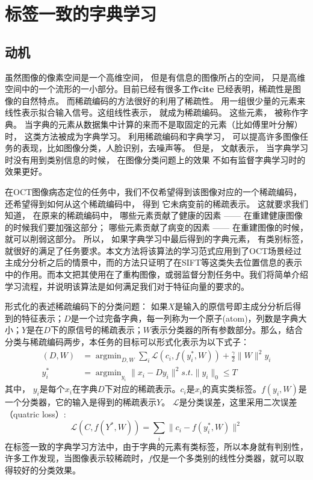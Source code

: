 \section{标签一致的字典学习}
\label{sec:lc-ksvd}
    \subsection{动机}
    虽然图像的像素空间是一个高维空间， 但是有信息的图像所占的空间， 只是高维空间中的一个流形的一小部分。目前已经有很多工作\textbf{cite} 已经表明，稀疏性是图像的自然特点。 而稀疏编码的方法很好的利用了稀疏性。 用一组很少量的元素来线性表示拟合输入信号。这组线性表示， 就成为稀疏编码。 这些元素， 被称作字典。 当字典的元素从数据集中计算的来而不是取固定的元素（比如傅里叶分解）时， 这类方法被成为字典学习。  利用稀疏编码和字典学习， 可以提高许多图像任务的表现，比如图像分类\cite{lazebnik2006beyond,gao2010kernel}，人脸识别\cite{zhang2010discriminative,wright2009robust}，去噪声\cite{elad2006image, dong2013nonlocally, dong2014learning}等。  但是， 文献表示， 当字典学习时没有用到类别信息的时候，  在图像分类问题上的效果 不如有监督字典学习时的效果更好。 

    在OCT图像病态定位的任务中，我们不仅希望得到该图像对应的一个稀疏编码， 还希望得到如何从这个稀疏编码中， 得到 它未病变前的稀疏表示。 这就要求我们 知道， 在原来的稀疏编码中， 哪些元素贡献了健康的因素 —— 在重建健康图像的时候我们要加强这部分； 哪些元素贡献了病变的因素 —— 在重建图像的时候， 就可以削弱这部分。  所以， 如果字典学习中最后得到的字典元素， 有类别标签\cite{jiang2013label}， 就很好的满足了任务要求。本文方法将该算法的学习范式应用到了OCT场景经过主成分分析之后的情景中，而的方法只证明了在SIFT等这类失去位置信息的表示中的作用。而本文把其使用在了重构图像，或弱监督分割任务中。我们将简单介绍学习流程，并说明该算法是如何满足我们对于特征向量的要求的。

    形式化的表述稀疏编码下的分类问题：    
    如果$X$是输入的原信号即主成分分析后得到的特征表示；$D$是一个过完备字典，每一列称为一个原子(atom)，列数是字典大小；$Y$是在$D$下的原信号的稀疏表示；$W$表示分类器的所有参数部分。那么，结合分类与稀疏编码两步，本任务的目标可以形式化表示为以下式子\cite{jiang2013label}：
    \begin{align}
        (D, W) & = \mathop{\arg \min}_{D, W} \sum_i \mathcal{L} (c_i, f(y_i^*, W)) + \frac{\gamma}{2}\|W\| ^2
        y_i \\
        y_i^* & = \mathop{\arg \min}_{y_i} \|x_i - Dy_i\| ^2 s.t. \|y_i\|_0 \le T \label{alg:line:ksvd-over2}
    \end{align}
    其中， $y_i$是每个$x_i$在字典$D$下对应的稀疏表示。$c_i$是$x_i$的真实类标签。$f(y_i, W)$是一个分类器，它的输入是得到的稀疏表示$Y$。 $\mathcal{L}$是分类误差，这里采用二次误差（quatric loss）:
    \begin{equation}
        \mathcal{L}(C, f(Y^*, W)) = \sum _i \|c_i - f(y_i^* , W) \| ^2 
    \end{equation}
    在标签一致的字典学习方法中，由于字典的元素有类标签，所以本身就有判别性，许多工作\cite{jiang2013label,yang2009linear}发现，当图像表示较稀疏时，$f$仅是一个多类别的线性分类器，就可以取得较好的分类效果。

